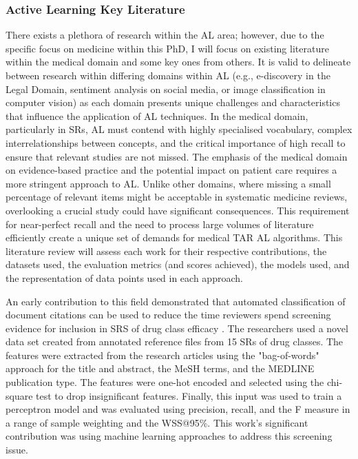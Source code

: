 \documentclass[../main.tex]{subfiles}
\begin{document}
\subsubsection{Active Learning Key Literature}
There exists a plethora of research within the AL area; however, due to the specific focus on medicine within this PhD, I will focus on existing literature within the medical domain and some key ones from others. It is valid to delineate between research within differing domains within AL (e.g., e-discovery in the Legal Domain, sentiment analysis on social media, or image classification in computer vision) as each domain presents unique challenges and characteristics that influence the application of AL techniques. In the medical domain, particularly in SRs, AL must contend with highly specialised vocabulary, complex interrelationships between concepts, and the critical importance of high recall to ensure that relevant studies are not missed.
The emphasis of the medical domain on evidence-based practice and the potential impact on patient care requires a more stringent approach to AL. Unlike other domains, where missing a small percentage of relevant items might be acceptable in systematic medicine reviews, overlooking a crucial study could have significant consequences. This requirement for near-perfect recall and the need to process large volumes of literature efficiently create a unique set of demands for medical TAR AL algorithms. This literature review will assess each work for their respective contributions, the datasets used, the evaluation metrics (and scores achieved), the models used, and the representation of data points used in each approach.

An early contribution to this field demonstrated that automated classification of document citations can be used to reduce the time reviewers spend screening evidence for inclusion in SRS of drug class efficacy \cite{cohen_reducing_2006}. The researchers used a novel data set created from annotated reference files from 15 SRs of drug classes. The features were extracted from the research articles using the "bag-of-words" approach for the title and abstract, the MeSH terms, and the MEDLINE publication type. The features were one-hot encoded and selected using the chi-square test to drop insignificant features. Finally, this input was used to train a perceptron model and was evaluated using precision, recall, and the F measure in a range of sample weighting and the WSS@95\%. This work's significant contribution was using machine learning approaches to address this screening issue.
\end{document}

